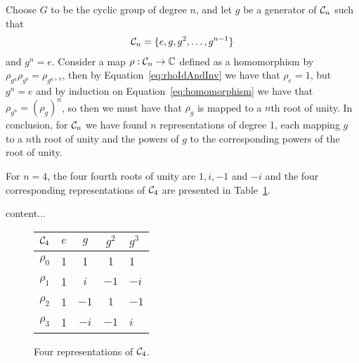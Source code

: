 
Choose $G$ to be the cyclic group of degree $n$, and let $g$ be a generator of $\mathcal{C}_n$ such that 
\begin{align*}
	\mathcal{C}_n = \{ e, g, g^2, \dots, g^{n-1}\}
\end{align*}
and $g^n = e$. Consider a map $\rho: \mathcal{C}_n \rightarrow \mathbb{C}$ defined as a homomorphism by $\rho_{g^a}\rho_{g^b} = \rho_{g^{a+b}}$, then by Equation~\ref{eq:rhoIdAndInv} we have that $\rho_e = 1$, but $g^n = e$ and by induction on Equation~\ref{eq:homomorphism} we have that $\rho_{g^n} = (\rho_g)^n$, so then we must have that $\rho_g$ is mapped to a $n$th root of unity.
In conclusion, for $\mathcal{C}_n$ we have found $n$ representations of degree 1, each mapping $g$ to a $n$th root of unity and the powers of $g$ to the corresponding powers of the root of unity.

\begin{example}
	
\end{example}
	
	For $n = 4$, the four fourth roots of unity are $1,i,-1$ and $-i$ and the four corresponding representations of $\mathcal{C}_4$ are presented in Table~\ref{mynicetable}.
	
	\begin{table}[hbt!]
		
		content...
	\end{table}

\begin{figure}[hbt!]
	\begin{tabular}{c | c c cl}
		$\mathcal{C}_4$ & $e$ & $g$  & $g^2$ & $g^3$ \\ \hline
		$\rho_0$           & 1   & 1    & 1     & 1     \\
		$\rho_1$           & 1   & $i$  & $-1$  & $-i$  \\
		$\rho_2$           & 1   & $-1$ & $1$  & $-1$   \\
		$\rho_3$           & 1   & $-i$ & $-1$   & $i$
		
	\end{tabular}
	\centering
	\label{mynicetable}
	\caption{Four representations of $\mathcal{C}_4$.}
\end{figure}

